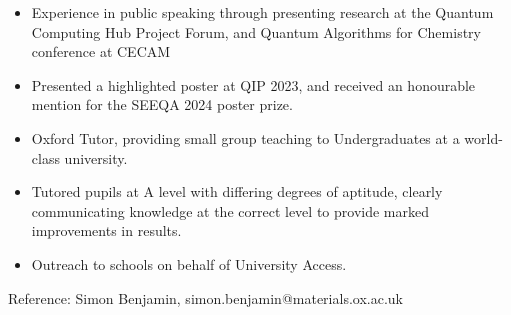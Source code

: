 \documentclass[margin, 10pt]{res} %
\begin{document}
\begin{resume}
\begin{itemize}
    \item Experience in public speaking through presenting research at the
    Quantum Computing Hub Project Forum, and Quantum
    Algorithms for Chemistry conference at CECAM
    \item Presented a highlighted poster at QIP 2023, and received an honourable mention for the SEEQA 2024 poster prize.
    \item Oxford Tutor, providing small group teaching to Undergraduates
    at a world-class university.
    \item Tutored pupils at A level with differing degrees of aptitude, clearly
    communicating knowledge at the correct level to provide marked
    improvements in results.
    \item Outreach to schools on behalf of University Access.
\end{itemize}


\end{resume}

\vspace{3cm}
Reference: Simon Benjamin, simon.benjamin@materials.ox.ac.uk
\end{document}

